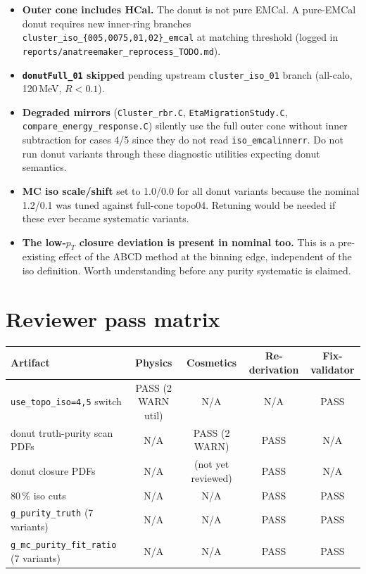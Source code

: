 \documentclass[11pt,a4paper]{article}
\begin{document}
\begin{itemize}
  \item \textbf{Outer cone includes HCal.} The donut is not pure EMCal.
    A pure-EMCal donut requires new inner-ring branches
    \texttt{cluster\_iso\_\{005,0075,01,02\}\_emcal} at matching threshold
    (logged in \texttt{reports/anatreemaker\_reprocess\_TODO.md}).
  \item \textbf{\texttt{donutFull\_01} skipped} pending upstream
    \texttt{cluster\_iso\_01} branch (all-calo, 120\,MeV, $R<0.1$).
  \item \textbf{Degraded mirrors} (\texttt{Cluster\_rbr.C},
    \texttt{EtaMigrationStudy.C}, \texttt{compare\_energy\_response.C})
    silently use the full outer cone without inner subtraction for cases 4/5
    since they do not read \texttt{iso\_emcalinnerr}. Do not run donut
    variants through these diagnostic utilities expecting donut semantics.
  \item \textbf{MC iso scale/shift} set to 1.0/0.0 for all donut variants
    because the nominal 1.2/0.1 was tuned against full-cone topo04. Retuning
    would be needed if these ever became systematic variants.
  \item \textbf{The low-$p_T$ closure deviation is present in nominal too.}
    This is a pre-existing effect of the ABCD method at the binning edge,
    independent of the iso definition. Worth understanding before any
    purity systematic is claimed.
\end{itemize}

\section*{Reviewer pass matrix}

\begin{table}[H]
\centering
\begin{tabular}{lcccc}
\toprule
Artifact & Physics & Cosmetics & Re-derivation & Fix-validator \\
\midrule
\texttt{use\_topo\_iso=4,5} switch & PASS (2 WARN util) & N/A & N/A & PASS \\
donut truth-purity scan PDFs & N/A & PASS (2 WARN) & PASS & N/A \\
donut closure PDFs & N/A & (not yet reviewed) & PASS & N/A \\
80\,\% iso cuts & N/A & N/A & PASS & PASS \\
\texttt{g\_purity\_truth} (7 variants) & N/A & N/A & PASS & PASS \\
\texttt{g\_mc\_purity\_fit\_ratio} (7 variants) & N/A & N/A & PASS & PASS \\
\bottomrule
\end{tabular}
\end{table}
\end{document}
